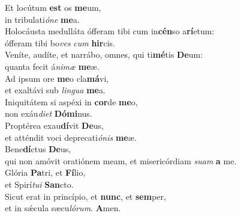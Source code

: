 \oddverse Et locútum \textbf{est} os \textbf{me}um,~\*\\
\oddverse in tribulati\textit{ó}\textit{ne} \textbf{me}a.\\
\evenverse Holocáusta medulláta ófferam tibi cum in\textbf{cén}so a\textbf{rí}etum:~\*\\
\evenverse ófferam tibi bo\textit{ves} \textit{cum} \textbf{hir}cis.\\
\oddverse Veníte, audíte, et narrábo, omnes, qui ti\textbf{mé}tis \textbf{De}um:~\*\\
\oddverse quanta fecit á\textit{ni}\textit{mæ} \textbf{me}æ.\\
\evenverse Ad ipsum ore \textbf{me}o cla\textbf{má}vi,~\*\\
\evenverse et exaltávi sub \textit{lin}\textit{gua} \textbf{me}a.\\
\oddverse Iniquitátem si aspéxi in \textbf{cor}de \textbf{me}o,~\*\\
\oddverse non exáu\textit{di}\textit{et} \textbf{Dó}\textbf{mi}nus.\\
\evenverse Proptérea exau\textbf{dí}vit \textbf{De}us,~\*\\
\evenverse et atténdit voci deprecati\textit{ó}\textit{nis} \textbf{me}æ.\\
\oddverse Bene\textbf{dí}ctus \textbf{De}us,~\*\\
\oddverse qui non amóvit oratiónem meam, et misericórdiam \textit{su}\textit{am} \textbf{a} me.\\
\evenverse Glória \textbf{Pa}tri, et \textbf{Fí}lio,~\*\\
\evenverse et Spirí\textit{tu}\textit{i} \textbf{San}cto.\\
\oddverse Sicut erat in princípio, et \textbf{nunc}, et \textbf{sem}per,~\*\\
\oddverse et in sǽcula sæcu\textit{ló}\textit{rum}. \textbf{A}men.\\
